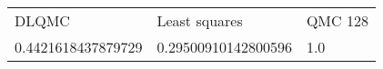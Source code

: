 \begin{tabular}{lll}
\toprule
 DLQMC              & Least squares       & QMC 128 \\
 0.4421618437879729 & 0.29500910142800596 & 1.0     \\
\bottomrule
\end{tabular}%
